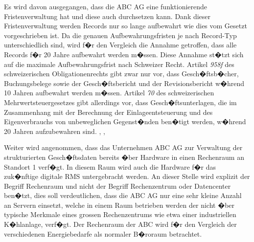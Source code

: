 \documentclass[a4paper,twoside,10pt]{report}
\begin{document}
Es wird davon ausgegangen, dass die ABC AG eine funktionierende Fristenverwaltung hat und diese auch durchsetzen kann. Dank dieser Fristenverwaltung werden Records nur so lange aufbewahrt wie dies vom Gesetzt vorgeschrieben ist. Da die genauen Aufbewahrungsfristen je nach Record-Typ unterschiedlich sind, wird f�r den Vergleich die Annahme getroffen, dass alle Records f�r 20 Jahre aufbewahrt werden m�ssen. Diese Annahme st�tzt sich auf die maximale Aufbewahrungsfrist nach Schweizer Recht. Artikel \emph{958f} des schweizerischen Obligationenrechts gibt zwar nur vor, dass Gesch�ftsb�cher, Buchungsbelege sowie der Gesch�ftsbericht und der Revisionsbericht w�hrend 10 Jahren aufbewahrt werden m�ssen. Artikel \emph{70} des schweizerischen Mehrwertsteuergesetzes gibt allerdings vor, dass Gesch�ftsunterlagen, die im Zusammenhang mit der Berechnung der Einlageentsteuerung und des Eigenverbrauchs von unbeweglichen Gegenst�nden ben�tigt werden, w�hrend 20 Jahren aufzubewahren sind. \cite{mwst}, \cite{obli}, \cite{rmGest}

Weiter wird angenommen, dass das Unternehmen ABC AG zur Verwaltung der strukturierten Gesch�ftsdaten bereits �ber Hardware in einen Rechenraum an Standort 1 verf�gt. In diesem Raum wird auch die Hardware f�r das zuk�nftige digitale \ac{RMS} untergebracht werden.  An dieser Stelle wird explizit der Begriff Rechenraum und nicht der Begriff Rechenzentrum oder Datencenter ben�tzt, dies soll verdeutlichen, dass die ABC AG nur eine sehr kleine Anzahl an Servern einsetzt, welche in einem Raum betrieben werden der nicht �ber typische Merkmale eines grossen Rechenzentrums wie etwa einer industriellen K�hlanlage, verf�gt. Der Rechenraum der ABC wird f�r den Vergleich der verschiedenen Energiebedarfe als normaler B�roraum betrachtet.

\end{document}
